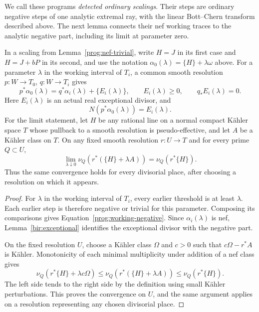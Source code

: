 We call these programs \emph{detected ordinary scalings}. Their steps
are ordinary negative steps of one analytic extremal ray, with the
linear Bott--Chern transform described above.
The next lemma connects their nef working traces
to the analytic negative part, including its limit at parameter zero.

\begin{lemma}
\label{prog:negative-along-scaling}
In a scaling from Lemma~\ref{prog:nef-trivial}, write \(H=J\) in its first
case and \(H=J+bP\) in its second, and use the notation
\(\alpha_0(\lambda)=\{H\}+\lambda\omega\) above. For a parameter
\(\lambda\) in the working interval of \(T_i\), a common smooth
resolution \(p:W\to T_0\), \(q:W\to T_i\) gives
\begin{equation}
 p^*\alpha_0(\lambda)=q^*\alpha_i(\lambda)+\{E_i(\lambda)\},
 \qquad E_i(\lambda)\geq0,\qquad q_*E_i(\lambda)=0.
 \label{prog:working-negative}
\end{equation}
Here \(E_i(\lambda)\) is an actual real exceptional divisor, and
\[
 N(p^*\alpha_0(\lambda))=E_i(\lambda).
\]
For the limit statement, let \(H\) be any rational line on a normal compact
Kähler space \(T\) whose pullback to a smooth resolution is
pseudo-effective, and let \(A\) be a Kähler class on \(T\). On any fixed
smooth resolution \(r:U\to T\) and for every prime \(Q\subset U\),
\[
 \lim_{\lambda\downarrow0}\nu_Q(r^*(\{H\}+\lambda A))
   =\nu_Q(r^*\{H\}).
\]
Thus the same convergence holds for every divisorial place, after choosing
a resolution on which it appears.
\end{lemma}

\begin{proof}
For \(\lambda\) in the working interval of \(T_i\), every earlier
threshold is at least \(\lambda\). Each earlier step is therefore negative
or trivial for this parameter. Composing its comparisons gives
Equation~\eqref{prog:working-negative}. Since \(\alpha_i(\lambda)\) is
nef, Lemma~\ref{bir:exceptional} identifies the exceptional divisor with
the negative part.

On the fixed resolution \(U\), choose a Kähler class \(\Omega\) and
\(c>0\) such that \(c\Omega-r^*A\) is Kähler. Monotonicity of each
minimal multiplicity under addition of a nef class gives
\[
 \nu_Q(r^*\{H\}+\lambda c\Omega)
 \leq \nu_Q(r^*(\{H\}+\lambda A))
 \leq \nu_Q(r^*\{H\}).
\]
The left side tends to the right side by the definition using small Kähler
perturbations. This proves the convergence on \(U\), and the same argument
applies on a resolution representing any chosen divisorial place.
\end{proof}

